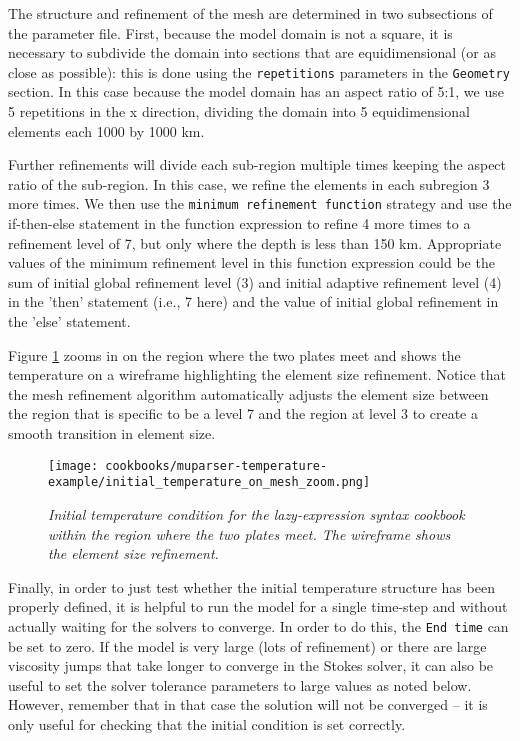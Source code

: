\documentclass{article}
\begin{document}
The structure and refinement of the mesh are determined in two subsections of the parameter file. First, because the model domain is not a square, it is necessary to subdivide the domain into sections that are equidimensional (or as close as possible): this is done using the \texttt{repetitions} parameters in the \texttt{Geometry} section. In this case because the model domain has an aspect ratio of 5:1, we use 5 repetitions in the x direction, dividing the domain into 5 equidimensional elements each 1000 by 1000 km.

Further refinements will divide each sub-region multiple times keeping the aspect ratio of the sub-region. In this case, we refine the elements in each subregion 3 more times. We then use the \texttt{minimum refinement function} strategy and use the if-then-else statement in the function expression to refine 4 more times to a refinement level of 7, but only where the depth is less than 150 km. Appropriate values of the minimum refinement level in this function expression could be the sum of initial global refinement level (3) and initial adaptive refinement level (4) in the 'then' statement (i.e., 7 here) and the value of initial global refinement in the 'else' statement.

Figure \ref{lazy-expression-tempic-zoom} zooms in on the region where the two plates meet and shows the temperature on a wireframe highlighting the element size refinement. Notice that the mesh refinement algorithm automatically adjusts the element size between the region that is specific to be a level 7 and the region at level 3 to create a smooth transition in element size.
\begin{figure}
\centering
\texttt{[image: cookbooks/muparser-temperature-example/initial\_temperature\_on\_mesh\_zoom.png]}
\caption{\it Initial temperature condition for the lazy-expression syntax cookbook within the region where the two plates meet. The wireframe shows the element size refinement. \label{lazy-expression-tempic-zoom}}
\end{figure}

Finally, in order to just test whether the initial temperature structure has been properly defined, it is helpful to run the model for a single time-step and without actually waiting for the solvers to converge. In order to do this, the \texttt{End time} can be set to zero. If the model is very large (lots of refinement) or there are large viscosity jumps that take longer to converge in the Stokes solver, it can also be useful to set the solver tolerance parameters to large values as noted below. However, remember that in that case the solution will not be converged -- it is only useful for checking that the initial condition is set correctly.

\end{document}
